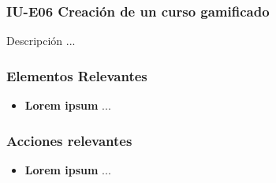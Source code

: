 
\subsubsection{IU-E06 Creación de un curso gamificado}

 Descripción ...


\subsubsection{Elementos Relevantes}

    \begin{itemize}
    \item {\bf Lorem ipsum}
        ...
    \end{itemize}

\subsubsection{Acciones relevantes}

    \begin{itemize}
    \item {\bf Lorem ipsum}
        ...
    \end{itemize}

\clearpage
